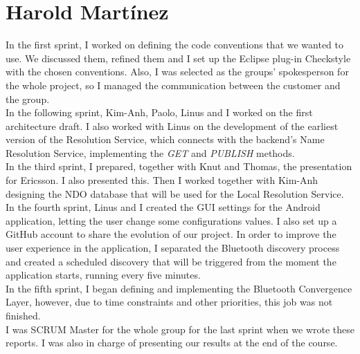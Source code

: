 \section{Harold Mart\'{i}nez}

In the first sprint, I worked on defining the code conventions that we wanted to use. 
We discussed them, refined them and I set up the Eclipse plug-in Checkstyle with the chosen conventions.
Also, I was selected as the groups' spokesperson for the whole project, so I managed the communication 
between the customer and the group.\\

In the following sprint, Kim-Anh, Paolo, Linus and I worked on the first architecture draft.
I also worked with Linus on the development of the earliest version of the Resolution Service, which connects with the 
backend's Name Resolution Service, implementing the \emph{GET} and \emph{PUBLISH} methods.\\

In the third sprint, I prepared, together with Knut and Thomas, the presentation for Ericsson. I also presented this. 
Then I worked together with Kim-Anh designing the NDO database that will be used for the 
Local Resolution Service.\\

In the fourth sprint, Linus and I created the GUI settings for the Android application, letting the user change 
some configurations values. I also set up a GitHub account to share the evolution of our project. In order to improve 
the user experience in the application, I separated the Bluetooth discovery process and created a scheduled discovery that 
will be triggered from the moment the application starts, running every five minutes.\\

In the fifth sprint, I began defining and implementing the Bluetooth Convergence Layer, however, due to time constraints 
and other priorities, this job was not finished. \\

I was SCRUM Master for the whole group for the last sprint when we wrote these reports. I was also in charge of presenting 
our results at the end of the course.\\

